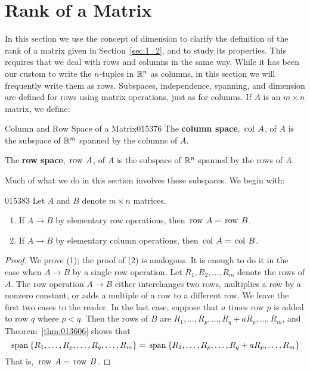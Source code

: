 \newpage
\section{Rank of a Matrix}
\label{sec:5_4}

In this section we use the concept of dimension to clarify the definition of the rank of a matrix given in Section~\ref{sec:1_2}, and to study its properties. This requires that we deal with rows and columns in the same way. While it has been our custom to write the $n$-tuples in $\mathbb{R}^n$ as columns, in this section we will frequently write them as rows. Subspaces, independence, spanning, and dimension are defined for rows using matrix operations, just as for columns. If $A$ is an $m \times n$ matrix, we define:

\begin{definition}{Column and Row Space of a Matrix}{015376} %
The \textbf{column space}, $\thinspace\operatorname{col\medspace} A$, of $A$ is the subspace of $\mathbb{R}^m$ spanned by the columns of $A$.

The \textbf{row space}, $\thinspace\operatorname{row\medspace} A$, of $A$ is the subspace of $\mathbb{R}^n$ spanned by the rows of $A$.
\end{definition}

\noindent Much of what we do in this section involves these subspaces. We begin with:

\begin{lemma}{}{015383}
Let $A$ and $B$ denote $m \times n$ matrices.

\begin{enumerate}
\item If $A \to B$ by elementary row operations, then $\thinspace\operatorname{row\medspace} A = \thinspace\operatorname{row\medspace} B$.

\item If $A \to B$ by elementary column operations, then $\thinspace\operatorname{col\medspace} A = \thinspace\operatorname{col\medspace} B$.

\end{enumerate}
\end{lemma}

\begin{proof}
We prove (1); the proof of (2) is analogous. It is enough to do it in the case when $A \to B$ by a single row operation. Let
$R_{1}, R_{2}, \dots, R_{m}$ denote the rows of $A$. The row
operation $A \to B$ either interchanges two rows, multiplies a row by
a nonzero constant, or adds a multiple of a row to a different row. We
leave the first two cases to the reader. In the last case, suppose
that $a$ times row $p$ is added to row $q$ where $p < q$. Then the
rows of $B$ are $R_{1}, \dots, R_{p}, \dots, R_{q} + aR_p, \dots,
R_{m}$, and Theorem~\ref{thm:013606} shows that
\begin{equation*}
\thinspace\operatorname{span\medspace}\{ R_1, \dots, R_p, \dots, R_q, \dots, R_m \} =
\thinspace\operatorname{span\medspace}\{ R_1, \dots, R_p, \dots, R_q + aR_p, \dots, R_m \}
\end{equation*}
That is, $\thinspace\operatorname{row\medspace} A = \thinspace\operatorname{row\medspace} B$.
\end{proof}

